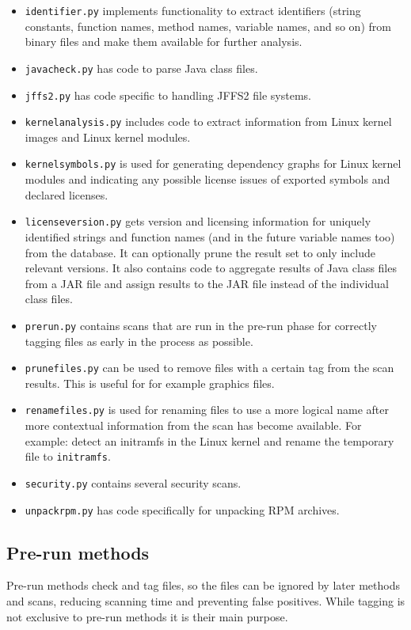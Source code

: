 \documentclass[10pt,a4paper]{article}
\begin{document}
\begin{itemize}
\item \texttt{identifier.py} implements functionality to extract identifiers
(string constants, function names, method names, variable names, and so on)
from binary files and make them available for further analysis.
\item \texttt{javacheck.py} has code to parse Java class files.
\item \texttt{jffs2.py} has code specific to handling JFFS2 file systems.
\item \texttt{kernelanalysis.py} includes code to extract information from
Linux kernel images and Linux kernel modules.
\item \texttt{kernelsymbols.py} is used for generating dependency graphs for
Linux kernel modules and indicating any possible license issues of exported
symbols and declared licenses.
\item \texttt{licenseversion.py} gets version and licensing information for
uniquely identified strings and function names (and in the future variable names
too) from the database. It can optionally prune the result set to only include
relevant versions. It also contains code to aggregate results of Java class
files from a JAR file and assign results to the JAR file instead of the
individual class files.
\item \texttt{prerun.py} contains scans that are run in the pre-run phase for
correctly tagging files as early in the process as possible.
\item \texttt{prunefiles.py} can be used to remove files with a certain tag
from the scan results. This is useful for for example graphics files.
\item \texttt{renamefiles.py} is used for renaming files to use a more logical
name after more contextual information from the scan has become available. For
example: detect an initramfs in the Linux kernel and rename the temporary file
to \texttt{initramfs}.
\item \texttt{security.py} contains several security scans.
\item \texttt{unpackrpm.py} has code specifically for unpacking RPM archives.
\end{itemize}

\subsection{Pre-run methods}

Pre-run methods check and tag files, so the files can be ignored by later
methods and scans, reducing scanning time and preventing false positives. While
tagging is not exclusive to pre-run methods it is their main purpose.
\end{document}
